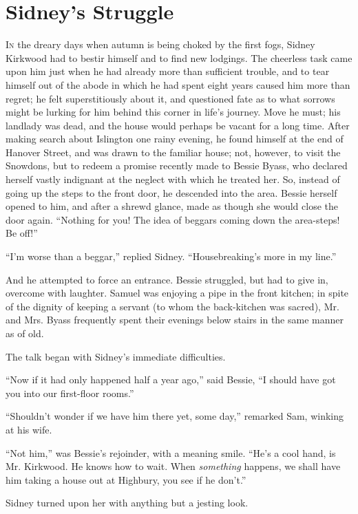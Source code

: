 \chapter{Sidney's Struggle}

\textsc{In} the dreary days when autumn is being choked by the first
fogs, Sidney Kirkwood had to bestir himself and to find new lodgings.
The cheerless task came upon him just when he had already more than
sufficient trouble, and to tear himself out of the abode in which he had
spent eight years caused him more than regret; he felt superstitiously
about it, and questioned fate as to what sorrows might be lurking for
him behind this corner in life's journey. Move he must; his landlady was
dead, and the house would perhaps be vacant for a long time. After
making search about Islington one rainy evening, he found himself at the
end of Hanover Street, and was drawn to the familiar house; not,
however, to visit the {}Snowdons, but to redeem a promise recently made
to Bessie Byass, who declared herself vastly indignant at the neglect
with which he treated her. So, instead of going up the steps to the
front door, he descended into the area. Bessie herself opened to him,
and after a shrewd glance, made as though she would close the door
again. ``Nothing for you! The idea of beggars coming down the
area-steps! Be off!''

``I'm worse than a beggar,'' replied Sidney. ``Housebreaking's more in
my line.''

And he attempted to force an entrance. Bessie struggled, but had to give
in, overcome with laughter. Samuel was enjoying a pipe in the front
kitchen; in spite of the dignity of keeping a servant (to whom the
back-kitchen was sacred), Mr. and Mrs. Byass frequently spent their
evenings below stairs in the same manner as of old.

The talk began with Sidney's immediate difficulties.

``Now if it had only happened half a year ago,'' said Bessie, ``I should
have got you into our first-floor rooms.''

{}``Shouldn't wonder if we have him there yet, some day,'' remarked Sam,
winking at his wife.

``Not him,'' was Bessie's rejoinder, with a meaning smile. ``He's a cool
hand, is Mr. Kirkwood. He knows how to wait. When \emph{something}
happens, we shall have him taking a house out at Highbury, you see if he
don't.''

Sidney turned upon her with anything but a jesting look.

